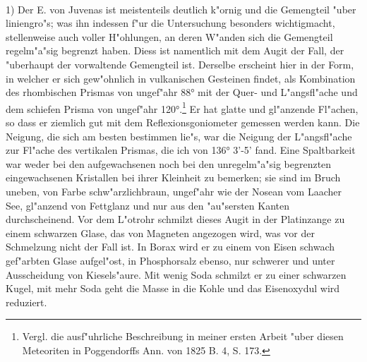 \documentclass[a4paper, 11pt, oneside, german]{article}
\begin{document}
\paragraph{}
1) Der E. von Juvenas ist meistenteils deutlich k"ornig und die Gemengteil "uber liniengro"s; was ihn indessen f"ur die Untersuchung besonders wichtigmacht, stellenweise auch voller H"ohlungen‚ an deren W"anden sich die Gemengteil regelm"a"sig begrenzt haben. Diess ist namentlich mit dem Augit der Fall, der "uberhaupt der vorwaltende Gemengteil ist. Derselbe erscheint hier in der Form, in welcher er sich gew"ohnlich in vulkanischen Gesteinen findet, als Kombination des rhombischen Prismas von ungef"ahr 88° mit der Quer- und L"angsfl"ache und dem schiefen Prisma von ungef"ahr 120°.\footnote{Vergl. die ausf"uhrliche Beschreibung in meiner ersten Arbeit "uber diesen Meteoriten in Poggendorffs Ann. von 1825 B. 4, S. 173.} Er hat glatte und gl"anzende Fl"achen, so dass er ziemlich gut mit dem Reflexionsgoniometer gemessen werden kann. Die Neigung, die sich am besten bestimmen lie"s, war die Neigung der L"angsfl"ache zur Fl"ache des vertikalen Prismas, die ich von 136° 3’-5’ fand. Eine Spaltbarkeit war weder bei den aufgewachsenen noch bei den unregelm"a"sig begrenzten eingewachsenen Kristallen bei ihrer Kleinheit zu bemerken; sie sind im Bruch uneben, von Farbe schw"arzlichbraun, ungef"ahr wie der Nosean vom Laacher See, gl"anzend von Fettglanz und nur aus den "au"sersten Kanten durchscheinend. Vor dem L"otrohr schmilzt dieses Augit in der Platinzange zu einem schwarzen Glase, das von Magneten angezogen wird, was vor der Schmelzung nicht der Fall ist. In Borax wird er zu einem von Eisen schwach gef"arbten Glase aufgel"ost, in Phosphorsalz ebenso, nur schwerer und unter Ausscheidung von Kiesels"aure. Mit wenig Soda schmilzt er zu einer schwarzen Kugel, mit mehr Soda geht die Masse in die Kohle und das Eisenoxydul wird reduziert.
\end{document}
